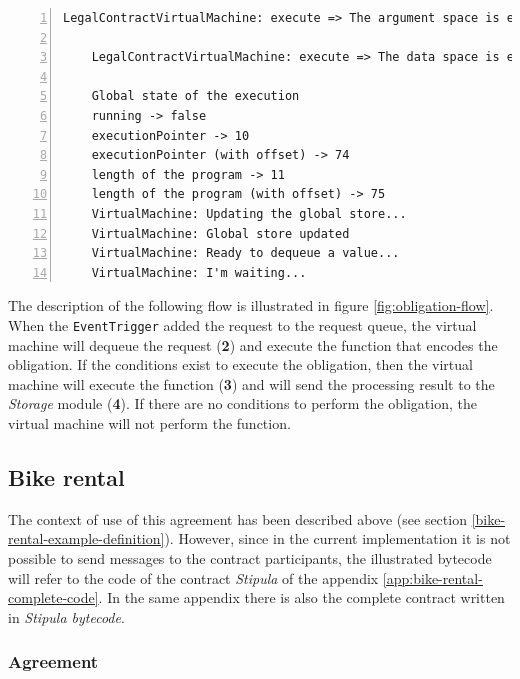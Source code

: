 {\begin{Verbatim}[numbers=left,xleftmargin=1cm,firstnumber=1,breaklines=true,breakanywhere=true,tabsize=2]
    LegalContractVirtualMachine: execute => The argument space is empty
  
    LegalContractVirtualMachine: execute => The data space is empty
  
    Global state of the execution
    running -> false
    executionPointer -> 10
    executionPointer (with offset) -> 74
    length of the program -> 11
    length of the program (with offset) -> 75
    VirtualMachine: Updating the global store...
    VirtualMachine: Global store updated
    VirtualMachine: Ready to dequeue a value...
    VirtualMachine: I'm waiting...
  \end{Verbatim}
}

The description of the following flow is illustrated in figure \ref{fig:obligation-flow}. When the 
\verb|EventTrigger| added the request to the request queue, the virtual machine will dequeue the request 
(\textbf{2}) and execute the function that encodes the obligation. If the conditions exist to execute the 
obligation, then the virtual machine will execute the function (\textbf{3}) and will send the processing 
result to the \textit{Storage} module (\textbf{4}). If there are no conditions to perform the obligation, 
the virtual machine will not perform the function.

\subsection{Bike rental}
\label{bike-rental-example}

The context of use of this agreement has been described above (see section 
\ref{bike-rental-example-definition}). However, since in the current implementation it is not possible to 
send messages to the contract participants, the illustrated bytecode will refer to the code of the 
contract \textit{Stipula} of the appendix \ref{app:bike-rental-complete-code}. In the same appendix 
there is also the complete contract written in \textit{Stipula bytecode}.

\subsubsection{Agreement}

